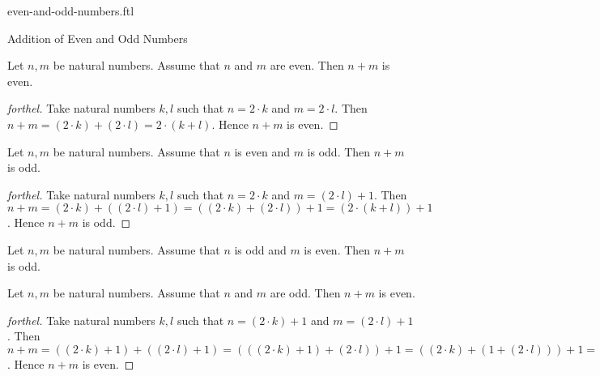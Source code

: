 \documentclass{naproche-library}
\begin{document}
\begin{smodule}[title=Even and Odd Numbers]{even-and-odd-numbers.ftl}
\begin{sfragment}{Addition of Even and Odd Numbers}
  \begin{proposition}[forthel,id=ARITHMETIC_15_7845441256365256]
    Let $n, m$ be natural numbers.
    Assume that $n$ and $m$ are even.
    Then $n + m$ is even.
  \end{proposition}
  \begin{proof}[forthel]
    Take natural numbers $k, l$ such that $n = 2 \cdot k$ and $m = 2 \cdot l$.
    Then $n + m
      = (2 \cdot k) + (2 \cdot l)
      = 2 \cdot (k + l)$.
    Hence $n + m$ is even.
  \end{proof}

  \begin{proposition}[forthel,id=ARITHMETIC_15_1023655256985478]
    Let $n, m$ be natural numbers.
    Assume that $n$ is even and $m$ is odd.
    Then $n + m$ is odd.
  \end{proposition}
  \begin{proof}[forthel]
    Take natural numbers $k, l$ such that $n = 2 \cdot k$ and $m = (2 \cdot l) + 1$.
    Then $n + m
      = (2 \cdot k) + ((2 \cdot l) + 1)
      = ((2 \cdot k) + (2 \cdot l)) + 1
      = (2 \cdot (k + l)) + 1$.
    Hence $n + m$ is odd.
  \end{proof}

  \begin{corollary}[forthel,id=ARITHMETIC_15_0125412589658745]
    Let $n, m$ be natural numbers.
    Assume that $n$ is odd and $m$ is even.
    Then $n + m$ is odd.
  \end{corollary}

  \begin{proposition}[forthel,id=ARITHMETIC_15_1023659854785412]
    Let $n, m$ be natural numbers.
    Assume that $n$ and $m$ are odd.
    Then $n + m$ is even.
  \end{proposition}
  \begin{proof}[forthel]
    Take natural numbers $k, l$ such that $n = (2 \cdot k) + 1$ and $m = (2 \cdot l) + 1$.
    Then $n + m
      = ((2 \cdot k) + 1) + ((2 \cdot l) + 1)
      = (((2 \cdot k) + 1) + (2 \cdot l)) + 1
      = ((2 \cdot k) + (1 + (2 \cdot l))) + 1
      = ((2 \cdot k) + ((2 \cdot l) + 1)) + 1
      = (((2 \cdot k) + (2 \cdot l)) + 1) + 1
      = ((2 \cdot k) + (2 \cdot l)) + (1 + 1)
      = ((2 \cdot k) + (2 \cdot l)) + 2
      = (2 \cdot (k + l)) + 2
      = 2 \cdot ((k + l) + 1)$.
      Hence $n + m$ is even.
  \end{proof}
\end{sfragment}


\end{smodule}
\end{document}
